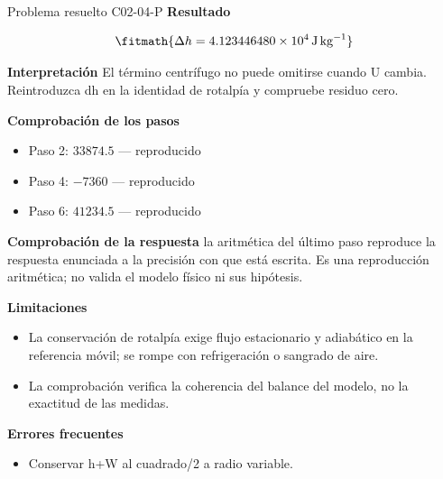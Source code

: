 \documentclass[10pt,openany]{book}
\begin{document}
\begin{studiumworked}{Problema resuelto C02-04-P}
\noindent\textbf{Resultado}

\[
\fitmath{\Delta h=4.123446480\times10^{4}\,\mathrm{J}\,\mathrm{kg}^{-1}}
\]

\noindent\textbf{Interpretación}
El término centrífugo no puede omitirse cuando U cambia. Reintroduzca dh en la identidad de rotalpía y compruebe residuo cero.

\noindent\textbf{Comprobación de los pasos}
\begin{itemize}
\item Paso 2: $33874.5$ — reproducido
\item Paso 4: $-7360$ — reproducido
\item Paso 6: $41234.5$ — reproducido
\end{itemize}

\noindent\textbf{Comprobación de la respuesta} la aritmética del último paso reproduce la respuesta enunciada a la precisión con que está escrita. Es una reproducción aritmética; no valida el modelo físico ni sus hipótesis.

\noindent\textbf{Limitaciones}
\begin{itemize}
\item La conservación de rotalpía exige flujo estacionario y adiabático en la referencia móvil; se rompe con refrigeración o sangrado de aire.
\item La comprobación verifica la coherencia del balance del modelo, no la exactitud de las medidas.
\end{itemize}

\noindent\textbf{Errores frecuentes}
\begin{itemize}
\item Conservar h+W al cuadrado/2 a radio variable.
\end{itemize}
\end{studiumworked}
\end{document}
